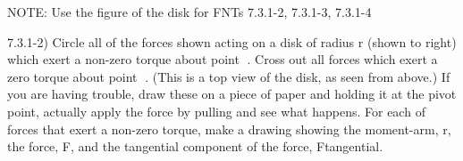 \label{fnt7.3.1-2}

NOTE: Use the figure of the disk for FNTs 7.3.1-2, 7.3.1-3, 7.3.1-4

7.3.1-2) Circle all of the forces shown acting on a disk of radius r (shown to right) which exert a non-zero torque about point .  Cross out all forces which exert a zero torque about point .  (This is a top view of the disk, as seen from above.)  If you are having trouble, draw these on a piece of paper and holding it at the pivot point, actually apply the force by pulling and see what happens.  For each of forces that exert a non-zero torque, make a drawing showing the moment-arm, r, the force, F, and the tangential component of the force, Ftangential.